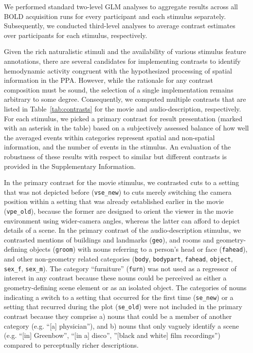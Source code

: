 \documentclass[english,11pt]{article}
\begin{document}
We performed standard two-level GLM analyses to aggregate results across all
BOLD acquisition runs for every participant and each stimulus separately.
Subsequently, we conducted third-level analyses to average contrast estimates
over participants for each stimulus, respectively.

Given the rich naturalistic stimuli and the availability of various stimulus
feature annotations, there are several candidates for implementing contrasts to
identify hemodynamic activity congruent with the hypothesized processing of
spatial information in the PPA.
However, while the rationale for any contrast composition must be sound, the
selection of a single implementation remains arbitrary to some degree.
Consequently, we computed multiple contrasts that are listed in
Table~\ref{tab:contrasts} for the movie and audio-description, respectively.
For each stimulus, we picked a primary contrast for result presentation (marked
  with an asterisk in the table) based on a subjectively assessed balance of how well
the averaged events within categories represent spatial and non-spatial
information, and the number of events in the stimulus.
An evaluation of the robustness of these results with respect to similar but
different contrasts is provided in the Supplementary Information.

In the primary contrast for the movie stimulus, we contrasted cuts to a setting
that was not depicted before (\texttt{vse\_new}) to cuts merely switching the
camera position within a setting that was already established earlier in the
movie (\texttt{vpe\_old}), because the former are designed to orient the viewer
in the movie environment using wider-camera angles, whereas the latter can
afford to depict details of a scene.
In the primary contrast of the audio-description stimulus, we contrasted
mentions of buildings and landmarks (\texttt{geo}), and rooms and
geometry-defining objects (\texttt{groom}) with nouns referring to a person's
head or face (\texttt{fahead}), and other non-geometry related categories
(\texttt{body}, \texttt{bodypart}, \texttt{fahead}, \texttt{object},
\texttt{sex\_f}, \texttt{sex\_m}).
The category ``furniture'' (\texttt{furn}) was not used as a regressor of
interest in any contrast because these nouns could be perceived as either a
geometry-defining scene element or as an isolated object.
The categories of nouns indicating a switch to a setting that occurred for the
first time (\texttt{se\_new}) or a setting that recurred during the plot
(\texttt{se\_old}) were not included in the primary contrast because they
comprise
a)  nouns that could be a member of another category (e.g. ``[a]
physician''), and
b) nouns that only vaguely identify a scene (e.g. ``[in] Greenbow'', ``[in a]
disco'', ''[black and white] film recordings'') compared to perceptually richer
descriptions.
\end{document}

